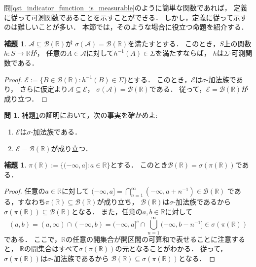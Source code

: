 \documentclass{jsreport}
\theoremstyle{definition}
\newtheorem{lem}[defi]{補題}
\newtheorem{qst}[defi]{問}
\begin{document}
問\ref{qst_indicator_function_is_measurable}のように簡単な関数であれば，
定義に従って可測関数であることを示すことができる．
しかし，定義に従って示すのは難しいことが多い．
本節では，そのような場合に役立つ命題を紹介する．

\begin{lem}\label{lem_measurability_and_generated_sigma_algebra}
$\mathcal{A}\subseteq\mathcal{B}(\mathbb{R})$が
$\sigma(\mathcal{A})=\mathcal{B}(\mathbb{R})$を満たすとする．
このとき，$S$上の関数$h \colon S\to\mathbb{R}$が，
任意の$A\in\mathcal{A}$に対して$h^{-1}(A)\in\Sigma$を満たすならば，
$h$は$\Sigma$-可測関数である．
\end{lem}

\begin{proof}
$\mathcal{E}:=\{B\in\mathcal{B}(\mathbb{R}):h^{-1}(B)\in\Sigma\}$とする．
このとき，$\mathcal{E}$は$\sigma$-加法族であり，
さらに仮定より$\mathcal{A}\subseteq\mathcal{E}$，
$\sigma(\mathcal{A})=\mathcal{B}(\mathbb{R})$である．
従って，$\mathcal{E}=\mathcal{B}(\mathbb{R})$が成り立つ．
\end{proof}

\begin{qst}\label{qst_proof_of_measurability_and_generated_sigma_algebra}
補題\ref{lem_measurability_and_generated_sigma_algebra}の証明において，次の事実を確かめよ:
\begin{enumerate}
\item$\mathcal{E}$は$\sigma$-加法族である．
\item$\mathcal{E}=\mathcal{B}(\mathbb{R})$が成り立つ．
\end{enumerate}
\end{qst}

\begin{lem}\label{lem_what_Borel_real_set_is_generated_by}
$\pi(\mathbb{R}):=\{(-\infty,a]:a\in\mathbb{R}\}$とする．
このとき$\mathcal{B}(\mathbb{R})=\sigma(\pi(\mathbb{R}))$である．
\end{lem}

\begin{proof}
任意の$a\in\mathbb{R}$に対して
$(-\infty,a]=\displaystyle\bigcap_{n=1}^\infty(-\infty,a+n^{-1})\in\mathcal{B}(\mathbb{R})$
である，すなわち$\pi(\mathbb{R})\subseteq\mathcal{B}(\mathbb{R})$が成り立ち，
$\mathcal{B}(\mathbb{R})$は$\sigma$-加法族であるから
$\sigma(\pi(\mathbb{R}))\subseteq\mathcal{B}(\mathbb{R})$となる．
また，任意の$a,b\in\mathbb{R}$に対して
\[ (a,b)=(a,\infty)\cap(-\infty,b)
=(-\infty,a]^c\cap\bigcup_{n=1}^\infty(-\infty,b-n^{-1}]\in\sigma(\pi(\mathbb{R})) \]
である．
ここで，$\mathbb{R}$の任意の開集合が開区間の可算和で表せることに注意すると，
$\mathbb{R}$の開集合はすべて$\sigma(\pi(\mathbb{R}))$の元となることがわかる．
従って，$\sigma(\pi(\mathbb{R}))$は$\sigma$-加法族であるから
$\mathcal{B}(\mathbb{R})\subseteq\sigma(\pi(\mathbb{R}))$となる．
\end{proof}
\end{document}
